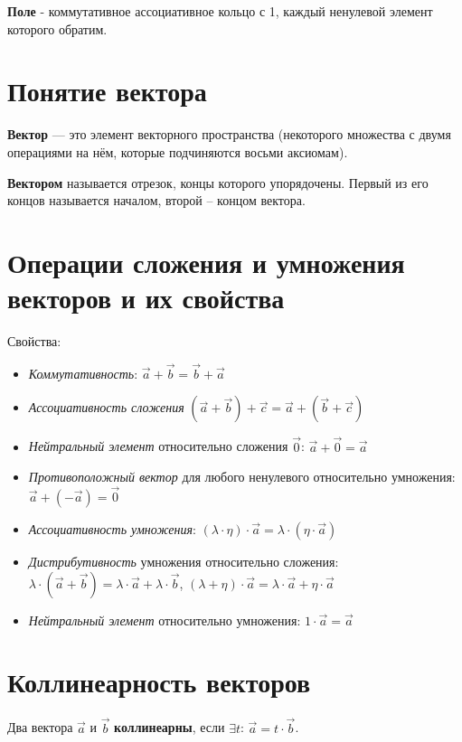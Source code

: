 \documentclass[a4paper]{article}
\begin{document}
{\begin{small}
\textbf{Поле} - коммутативное ассоциативное кольцо с 1, каждый ненулевой элемент которого обратим.




\section*{Понятие вектора}
\textbf{Вектор} — это элемент векторного пространства (некоторого множества с двумя операциями на нём, которые подчиняются восьми аксиомам).

\textbf{Вектором} называется отрезок,
концы которого упорядочены. Первый из его концов
называется началом, второй – концом вектора.

\section*{Операции сложения и умножения векторов и их свойства}

Свойства:
\begin{itemize}
\item \textit{Коммутативность}: $\vec{a} + \vec{b} = \vec{b} + \vec{a}$
\item \textit{Ассоциативность сложения} $(\vec{a} + \vec{b}) + \vec{c} = \vec{a} + (\vec{b}+\vec{c})$
\item \textit{Нейтральный элемент} относительно сложения $\vec{0}$: $\vec{a} + \vec{0} = \vec{a}$
\item \textit{Противоположный вектор} для любого ненулевого относительно умножения: $\vec{a}+(-\vec{a}) = \vec{0}$
\item \textit{Ассоциативность умножения}: $(\lambda \cdot \eta) \cdot \vec{a} = \lambda \cdot ( \eta \cdot \vec{a})$
\item \textit{Дистрибутивность} умножения относительно сложения: $\lambda \cdot (\vec{a} + \vec{b}) = \lambda \cdot \vec{a} + \lambda \cdot \vec{b}$, $(\lambda + \eta) \cdot \vec{a} = \lambda \cdot \vec{a} + \eta \cdot \vec{a}$
\item \textit{Нейтральный элемент} относительно умножения: $1 \cdot \vec{a} = \vec{a}$
\end{itemize}
\section*{Коллинеарность векторов}
Два вектора $\vec{a}$ и $\vec{b}$ \textbf{коллинеарны}, если $\exists t$: $\vec{a} = t \cdot \vec{b}$.


\end{small}}
\end{document}
